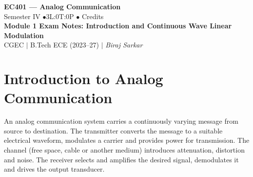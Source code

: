 \documentclass[12pt,a4paper]{article}
\begin{document}
\begin{center}
  {\LARGE\bfseries\color{myred} EC401 --- Analog Communication}\\[5pt]
  {\normalsize\color{mydark} Semester IV \quad$\bullet$\quad 3L:0T:0P \quad$\bullet$ Credits}\\[3pt]
  {\normalsize\color{myteal}\textbf{Module 1 Exam Notes: Introduction and Continuous Wave Linear Modulation}}\\[3pt]
  {\small\color{mydark} CGEC \;$|$\; B.Tech ECE (2023--27) \;$|$\; \textit{Biraj Sarkar}}
\end{center}
\vspace{2pt}
\noindent{\color{myred}\rule{\linewidth}{1.5pt}}
\vspace{2pt}

\hypersetup{linkcolor=mydark}
\tableofcontents
\hypersetup{linkcolor=myteal}
\newpage

\section{Introduction to Analog Communication}

\begin{tcolorbox}[defbox, title={Communication System and Modulation}]
An analog communication system carries a continuously varying message from source to destination. The transmitter converts the message to a suitable electrical waveform, modulates a carrier and provides power for transmission. The channel (free space, cable or another medium) introduces attenuation, distortion and noise. The receiver selects and amplifies the desired signal, demodulates it and drives the output transducer.
\end{tcolorbox}

\begin{tcolorbox}[tikzbox, unbreakable, title={Transmitter, Channel and Receiver}]
\centering
{}\par
\end{tcolorbox}
\end{document}
